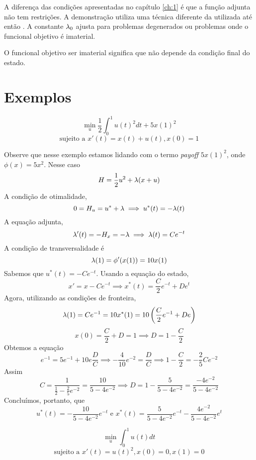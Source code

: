 A diferença das condições apresentadas no capítulo \ref{ch:1} é que a função adjunta não tem restrições. A demonstração utiliza
uma técnica diferente da utilizada até então \cite[147-153]{kamien2012dynamic}. A constante $\lambda_0$ ajusta para
problemas degenerados ou problemas onde o funcional objetivo é imaterial.

\begin{definition}
    O funcional objetivo ser imaterial significa que não depende da condição final do estado. 
\end{definition}

\section{Exemplos}

\begin{example}
    \begin{equation*}
        \min_u \frac{1}{2}\int_0^1 u(t)^2 dt + 5x(1)^2 
    \end{equation*}
    \begin{equation*}
        \text{sujeito a  }x'(t) = x(t) + u(t), x(0) = 1
    \end{equation*}
\end{example}

Observe que nesse exemplo estamos lidando com o termo \textit{payoff}
$5x(1)^2$, onde $\phi(x) = 5x^2$. Nesse caso
$$
H = \frac{1}{2}u^2 + \lambda(x + u)
$$
A condição de otimalidade, 
$$
0 = H_u = u^* + \lambda \implies u^*(t) = - \lambda(t)
$$
A equação adjunta, 
$$
\lambda '(t) = - H_x = - \lambda \implies \lambda(t) = Ce^{-t}
$$
A condição de transversalidade é 
$$
\lambda(1) = \phi '(x(1)) = 10x(1)
$$
Sabemos que $u^*(t) = -Ce^{-t}$. Usando a equação do estado, 
$$
x' = x - Ce^{-t} \implies x^{*}(t) = \frac{C}{2}e^{-t} + De^t
$$
Agora, utilizando as condições de fronteira,  
$$
\lambda(1) = Ce^{-1} = 10x^*(1) = 10\left(\frac{C}{2}e^{-1} + De\right)
$$
$$
x(0) = \frac{C}{2} + D = 1 \implies D = 1 - \frac{C}{2}
$$
Obtemos a equação
$$
e^{-1} = 5e^{-1} + 10e\frac{D}{C} \implies -\frac{4}{10}e^{-2} = \frac{D}{C} \implies 1 - \frac{C}{2} = -\frac{2}{5}Ce^{-2}
$$
Assim 
$$
C = \frac{1}{\frac{1}{2} - \frac{2}{5} e^{-2}} = \frac{10}{5 - 4e^{-2}} \implies D = 1 - \frac{5}{5 - 4e^{-2}} = \frac{-4e^{-2}}{5 - 4e^{-2}}
$$
Concluímos, portanto, que 
$$
u^{*}(t) = - \frac{10}{5 - 4e^{-2}}e^{-t} \text{ e }
x^{*}(t) = \frac{5}{5 - 4e^{-2}}e^{-t} - \frac{4e^{-2}}{5 - 4e^{-2}}e^t
$$

\begin{example}
    \begin{equation*}
        \min_u \int_0^1 u(t) dt
    \end{equation*}
    \begin{equation*}
        \text{sujeito a   }x'(t) = u(t)^2, x(0) = 0, x(1) = 0
    \end{equation*}
\end{example}

